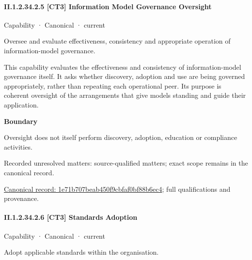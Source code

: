 \paragraph*{II.1.2.34.2.5 [CT3] Information Model Governance Oversight}
\label{navigation:II.1.2.34.2.5}

\label{element:1e71b707beab450f9cbfaf0bf88b6ec4}
{\small Capability · Canonical · current}\par

Oversee and evaluate effectiveness, consistency and appropriate operation of information-model governance.



This capability evaluates the effectiveness and consistency of information-model governance itself. It asks whether discovery, adoption and use are being governed appropriately, rather than repeating each operational peer. Its purpose is coherent oversight of the arrangements that give models standing and guide their application.



\textbf{Boundary}



Oversight does not itself perform discovery, adoption, education or compliance activities.


{\small Recorded unresolved matters: source-qualified matters; exact scope remains in the canonical record.}\par
{\footnotesize \href{../../../../continuum/strategy/capability/1e71b707beab450f9cbfaf0bf88b6ec4.md}{Canonical record: 1e71b707beab450f9cbfaf0bf88b6ec4}; full qualifications and provenance.}\par
\paragraph*{II.1.2.34.2.6 [CT3] Standards Adoption}
\label{navigation:II.1.2.34.2.6}

\label{element:0d59f956f5714d3985398f09aeb7c541}
{\small Capability · Canonical · current}\par

Adopt applicable standards within the organisation.



